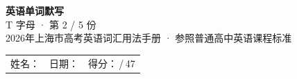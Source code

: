\documentclass[10pt,a4paper]{article}
\begin{document}
\pagestyle{plain}

\begin{center}
{\LARGE\bfseries 英语单词默写}\\[0.22em]
{\large T 字母 · 第 2 / 5 份}\\[0.18em]
{\small 2026年上海市高考英语词汇用法手册 · 参照普通高中英语课程标准}
\end{center}

\vspace{0.25em}
\noindent\begin{tabular}{@{}p{}@{}p{}@{}p{}@{}}
姓名：\underline{\hspace{2.0cm}} & 日期：\underline{\hspace{2.0cm}} & 得分：\underline{\hspace{1.3cm}}\,/\,47 \\
\end{tabular}

\vspace{0.3em}

\vspace{0.08em}
\end{document}

